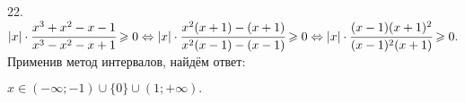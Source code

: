 22. $|x|\cdot\cfrac{x^3+x^2-x-1}{x^3-x^2-x+1}\geqslant 0\Leftrightarrow|x|\cdot\cfrac{x^2(x+1)-(x+1)}{x^2(x-1)-(x-1)}\geqslant 0\Leftrightarrow
|x|\cdot\cfrac{(x-1)(x+1)^2}{(x-1)^2(x+1)}\geqslant 0.$
Применив метод интервалов, найдём ответ:
\begin{figure}[ht!]
\end{figure}
$x\in(-\infty;-1)\cup\{0\}\cup(1;+\infty).$\\
